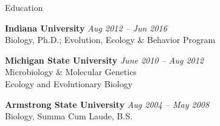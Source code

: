 \documentclass{resume} %
\begin{document}
\thispagestyle{empty}


\begin{rSection}{Education}

  {\bf Indiana University} \hfill {\em Aug 2012 -- Jun 2016} \\
  Biology, Ph.D.; Evolution, Ecology \& Behavior Program

  {\bf Michigan State University} \hfill {\em June 2010 -- Aug 2012} \\
  Microbiology \& Molecular Genetics \\
  Ecology and Evolutionary Biology

  {\bf Armstrong State University} \hfill {\em Aug 2004 -- May 2008} \\
  Biology, Summa Cum Laude, B.S.

\end{rSection}

\end{document}
